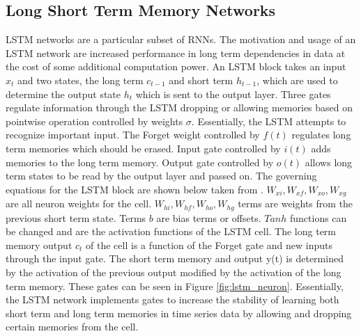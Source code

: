 \subsection{Long Short Term Memory Networks}
LSTM networks are a particular subset of RNNs. The motivation and usage of an LSTM network are increased performance in long term dependencies in data at the cost of some additional computation power. An LSTM block takes an input $x_t$ and two states, the long term $c_{t-1}$ and short term $h_{t-1}$, which are used to determine the output state $h_t$ which is sent to the output layer. Three gates regulate information through the LSTM dropping or allowing memories based on pointwise operation controlled by weights $\sigma$. Essentially, the LSTM attempts to recognize important input. The Forget weight controlled by $f(t)$ regulates long term memories which should be erased. Input gate controlled by $i(t)$ adds memories to the long term memory. Output gate controlled by $o(t)$ allows long term states to be read by the output layer and passed on.  The governing equations for the LSTM block are shown below taken from \cite{hands_on_lstm}. $W_{xi}, W_{xf}, W_{xo}, W_{xg}$ are all neuron weights for the cell.  $W_{hi}, W_{hf}, W_{ho}, W_{hg}$ terms are weights from the previous short term state. Terms $b$ are bias terms or offsets. $Tanh$ functions can be changed and are the activation functions of the LSTM cell. The long term memory output $c_t$ of the cell is a function of the Forget gate and new inputs through the input gate. The short term memory and output y(t) is determined by the activation of the previous output modified by the activation of the long term memory. These gates can be seen in Figure \ref{fig:lstm_neuron}. Essentially, the LSTM network implements gates to increase the stability of learning both short term and long term memories in time series data by allowing and dropping certain memories from the cell. 


